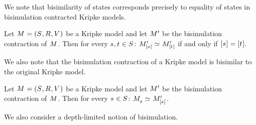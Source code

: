 We note that bisimilarity of states corresponds precisely to equality of states in bisimulation contracted Kripke models.

\begin{proposition}
Let $\kModelAndTuple$ be a Kripke model and let ${M^{\prime}_{}}$ be the bisimulation contraction of $\kModel$.
Then for every $\kStateS, \kStateT \in \kStates$: $\kPModelP{[\kStateS]} \bisimilar \kPModelP{[\kStateT]}$ if and only if $[\kStateS] = [\kStateT]$.
\end{proposition}

We also note that the bisimulation contraction of a Kripke model is bisimilar to the original Kripke model.

\begin{proposition}
Let $\kModelAndTuple$ be a Kripke model and let ${M^{\prime}_{}}$ be the bisimulation contraction of $\kModel$.
Then for every $\kStateS \in \kStates$: $\kPModel{\kStateS} \bisimilar \kPModelP{[\kStateS]}$.
\end{proposition}

We also consider a depth-limited notion of bisimulation.

